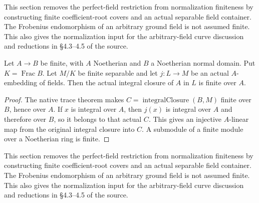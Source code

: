 \endgroup

\begingroup

This section removes the perfect-field restriction from normalization
finiteness by constructing finite coefficient-root covers and an actual
separable field container. The Frobenius endomorphism of an arbitrary
ground field is not assumed finite. This also gives the normalization
input for the arbitrary-field curve discussion and reductions in
\S4.3--4.5 of the source.

\begin{lemma}
\label{lem:normalization-finite-normal-cover-descent}
\leanok
Let $A\to B$ be finite, with $A$ Noetherian and $B$ a Noetherian
normal domain. Put $K=\operatorname{Frac}B$. Let $M/K$ be finite
separable and let $j:L\to M$ be an actual $A$-embedding of fields.
Then the actual integral closure of $A$ in $L$ is finite over $A$.
\end{lemma}
\begin{proof}
The native trace theorem makes $C=\operatorname{integralClosure}(B,M)$
finite over $B$, hence over $A$. If $x$ is integral over $A$, then
$j(x)$ is integral over $A$ and therefore over $B$, so it belongs to
that actual $C$. This gives an injective $A$-linear map from the
original integral closure into $C$. A submodule of a finite module
over a Noetherian ring is finite.
\end{proof}

\endgroup

\begingroup

This section removes the perfect-field restriction from normalization
finiteness by constructing finite coefficient-root covers and an actual
separable field container. The Frobenius endomorphism of an arbitrary
ground field is not assumed finite. This also gives the normalization
input for the arbitrary-field curve discussion and reductions in
\S4.3--4.5 of the source.

